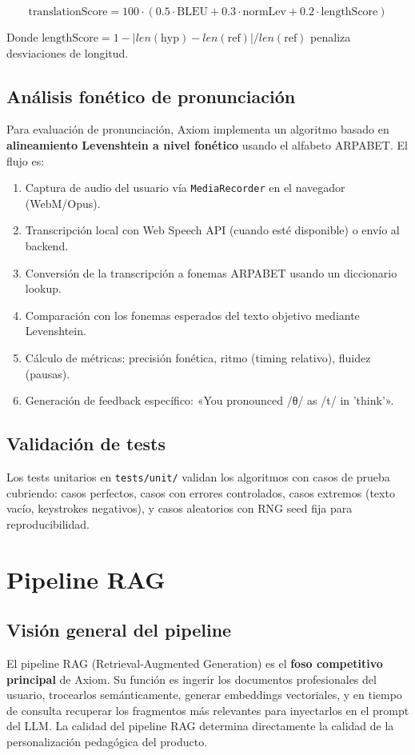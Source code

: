 \documentclass[10pt,a4paper,oneside]{report}
\begin{document}
\begin{equation}
\text{translationScore} = 100 \cdot \left(0.5 \cdot \text{BLEU} + 0.3 \cdot \text{normLev} + 0.2 \cdot \text{lengthScore}\right)
\end{equation}

Donde $\text{lengthScore} = 1 - |len(\text{hyp}) - len(\text{ref})| / len(\text{ref})$ penaliza desviaciones de longitud.

\section{Análisis fonético de pronunciación}
Para evaluación de pronunciación, Axiom implementa un algoritmo basado en \textbf{alineamiento Levenshtein a nivel fonético} usando el alfabeto ARPABET. El flujo es:

\begin{enumerate}[leftmargin=1.6em]
\item Captura de audio del usuario vía \texttt{MediaRecorder} en el navegador (WebM/Opus).
\item Transcripción local con Web Speech API (cuando esté disponible) o envío al backend.
\item Conversión de la transcripción a fonemas ARPABET usando un diccionario lookup.
\item Comparación con los fonemas esperados del texto objetivo mediante Levenshtein.
\item Cálculo de métricas: precisión fonética, ritmo (timing relativo), fluidez (pausas).
\item Generación de feedback específico: «You pronounced /θ/ as /t/ in 'think'».
\end{enumerate}

\section{Validación de tests}
Los tests unitarios en \texttt{tests/unit/} validan los algoritmos con casos de prueba cubriendo: casos perfectos, casos con errores controlados, casos extremos (texto vacío, keystrokes negativos), y casos aleatorios con RNG seed fija para reproducibilidad.

\chapter{Pipeline RAG}

\section{Visión general del pipeline}
El pipeline RAG (Retrieval-Augmented Generation) es el \textbf{foso competitivo principal} de Axiom. Su función es ingerir los documentos profesionales del usuario, trocearlos semánticamente, generar embeddings vectoriales, y en tiempo de consulta recuperar los fragmentos más relevantes para inyectarlos en el prompt del LLM. La calidad del pipeline RAG determina directamente la calidad de la personalización pedagógica del producto.
\end{document}

